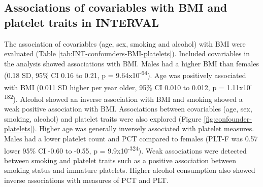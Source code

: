 \documentclass[11pt,twoside]{bristolthesis}
\begin{document}
\hypertarget{associations-of-covariables-with-bmi-and-platelet-traits-in-interval}{%
\subsection{Associations of covariables with BMI and platelet traits in INTERVAL}\label{associations-of-covariables-with-bmi-and-platelet-traits-in-interval}}

The association of covariables (age, sex, smoking and alcohol) with BMI were evaluated (Table \ref{tab:INT-confounders-BMI-platelets}). Included covariables in the analysis showed associations with BMI. Males had a higher BMI than females (0.18 SD, 95\% CI 0.16 to 0.21, p = 9.64x10\textsuperscript{-64}). Age was positively associated with BMI (0.011 SD higher per year older, 95\% CI 0.010 to 0.012, p = 1.11x10\textsuperscript{-182}). Alcohol showed an inverse association with BMI and smoking showed a weak positive association with BMI. Associations between covariables (age, sex, smoking, alcohol) and platelet traits were also explored (Figure \ref{fig:confounder-platelets}). Higher age was generally inversely associated with platelet measures. Males had a lower platelet count and PCT compared to females (PLT-F was 0.57 lower 95\% CI -0.60 to -0.55, p = 9.9x10\textsuperscript{-324}). Weak associations were detected between smoking and platelet traits such as a positive association between smoking status and immature platelets. Higher alcohol consumption also showed inverse associations with measures of PCT and PLT.
\end{document}
